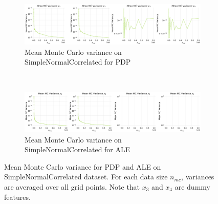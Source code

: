 \documentclass[runningheads]{llncs}
\begin{document}
\begin{figure}[h!]
    \centering
    \begin{subfigure}[b]{\textwidth}
        \centering
        \includegraphics[width=\textwidth]{img/SNC-all/mean_mc_variance_pdp.png}
        \caption{Mean Monte Carlo variance on SimpleNormalCorrelated for PDP}
    \end{subfigure}
    \\[10pt]
    \vfill
    \begin{subfigure}[b]{\textwidth}
        \centering
        \includegraphics[width=\textwidth]{img/SNC-all/mean_mc_variance_ale.png}
        \caption{Mean Monte Carlo variance on SimpleNormalCorrelated for ALE}
    \end{subfigure}
    \caption{Mean Monte Carlo variance for PDP and ALE on SimpleNormalCorrelated dataset.
    For each data size $n_{mc}$, variances are averaged over all grid points.
    Note that $x_3$ and $x_4$ are dummy features.}
    \label{fig:mean-mc-variance-snc}  %
\end{figure}
\end{document}
